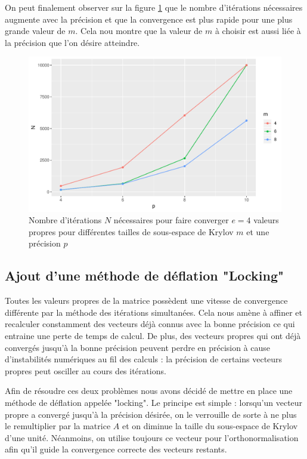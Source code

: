 \documentclass[11pt,a4paper]{article}
\begin{document}
		On peut finalement observer sur la figure \ref{fig:Nvsp-m_e4} que le nombre d'itérations nécessaires augmente avec la précision et que la convergence est plus rapide pour une plus grande valeur de $m$. Cela nou montre que la valeur de $m$ à choisir est aussi liée à la précision que l'on désire atteindre.

		\begin{figure}
			\centering
			\includegraphics[width=0.8\linewidth, keepaspectratio]{plots/Nvsp-m_e4.pdf}
			\caption{Nombre d'itérations $N$ nécessaires pour faire converger $e = 4$ valeurs propres pour différentes tailles de sous-espace de Krylov $m$ et une précision $p$ \label{fig:Nvsp-m_e4}}
		\end{figure}


	\subsection{Ajout d'une méthode de déflation "Locking"}
		Toutes les valeurs propres de la matrice possèdent une vitesse de convergence différente par la méthode des itérations simultanées. Cela nous amène à affiner et recalculer constamment des vecteurs déjà connus avec la bonne précision ce qui entraine une perte de temps de calcul. De plus, des vecteurs propres qui ont déjà convergés jusqu'à la bonne précision peuvent perdre en précision à cause d'instabilités numériques au fil des calculs : la précision de certains vecteurs propres peut osciller au cours des itérations.

		Afin de résoudre ces deux problèmes nous avons décidé de mettre en place une méthode de déflation appelée "locking". Le principe est simple : lorsqu'un vecteur propre a convergé jusqu'à la précision désirée, on le verrouille de sorte à ne plus le remultiplier par la matrice $A$ et on diminue la taille du sous-espace de Krylov d'une unité. Néanmoins, on utilise toujours ce vecteur pour l'orthonormalisation afin qu'il guide la convergence correcte des vecteurs restants.
\end{document}
